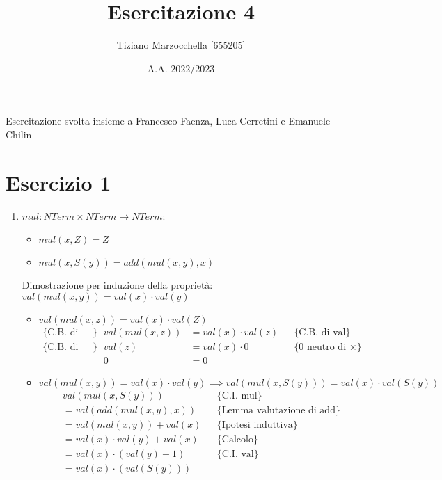 \documentclass{article}
\title{Esercitazione 4}
\author{Tiziano Marzocchella [655205]}
\date{A.A. 2022/2023}
\begin{document}
\maketitle

\noindent Esercitazione svolta insieme a Francesco Faenza, Luca Cerretini e Emanuele Chilin

\section{Esercizio 1}

\begin{enumerate}
    \item \(mul: NTerm \times NTerm \rightarrow NTerm\):
          \begin{itemize}
              \item[\text{[C.B.]}] \(mul(x,Z) = Z\)
              \item[\text{[C.I.]}] \(mul(x, S(y)) = add(mul(x,y),x)\)
          \end{itemize}
          Dimostrazione per induzione della proprietà: \(val(mul(x,y)) = val(x) \cdot val(y)\)
          \begin{itemize}
              \item[\text{[C.B.]}] \(val(mul(x,z)) = val(x) \cdot val(Z)\)
              \begin{align*}
                  \{\text{C.B. di mul}\} &  & val(mul(x,z)) & = val(x) \cdot val(z) &  & \{\text{C.B. di val}\}         \\
                  \{\text{C.B. di val}\} &  & val(z)        & = val(x) \cdot 0      &  & \{\text{0 neutro di } \times\} \\
                                         &  & 0             & = 0                   &  &
              \end{align*}
              \item[\text{[P.I.]}] \(val(mul(x,y)) = val(x) \cdot val(y) \implies val(mul(x, S(y))) = val(x) \cdot val(S(y))\)
              \begin{align*}
                   & val(mul(x, S(y)))              &  & \{\text{C.I. mul}\}                 \\
                   & = val(add(mul(x,y),x))         &  & \{\text{Lemma valutazione di add}\} \\
                   & = val(mul(x,y)) + val(x)       &  & \{\text{Ipotesi induttiva}\}        \\
                   & = val(x) \cdot val(y) + val(x) &  & \{\text{Calcolo}\}                  \\
                   & = val(x) \cdot (val(y) + 1)    &  & \{\text{C.I. val}\}                 \\
                   & = val(x) \cdot (val(S(y)))
              \end{align*}
          \end{itemize}


\end{enumerate}
\end{document}
